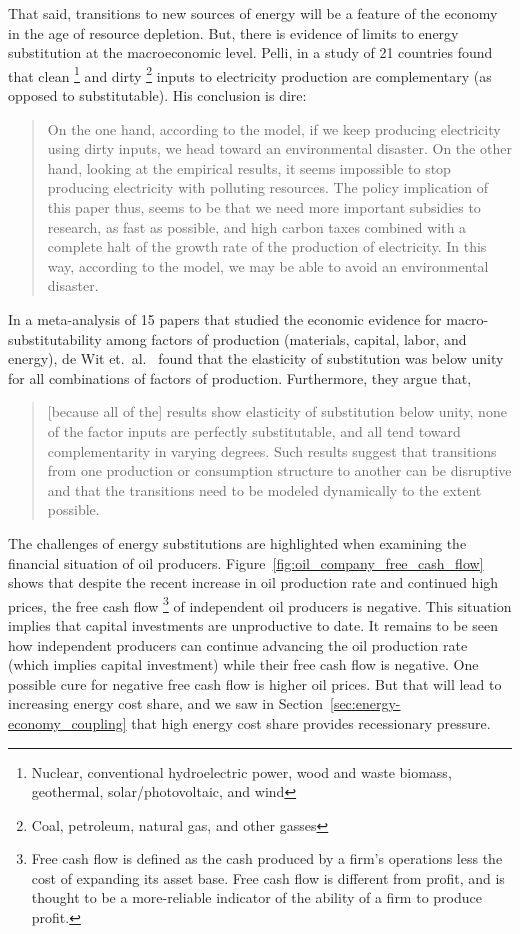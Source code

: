 That said, transitions to new sources of energy will be a feature 
of the economy in the age of resource depletion.
But, there is evidence of limits to energy substitution 
at the macroeconomic level.
Pelli, in a study of 21 countries 
found that clean%
	\footnote{
	Nuclear, 
	conventional hydroelectric power, wood and waste biomass, 
	geothermal, solar/photovoltaic, and wind
	}
and dirty%
	\footnote{
	Coal, 
	petroleum, natural gas, and other gasses
	}
inputs to electricity production
are complementary (as opposed to substitutable).\cite{Pelli:2012wv}
His conclusion is dire:
%
\begin{quote}
	On the one hand, according to the model, 
	if we keep producing electricity using dirty inputs, 
	we head toward an environmental disaster. 
	On the other hand, looking at the empirical results, 
	it seems impossible to stop producing electricity with polluting resources. 
	The policy implication of this paper thus, 
	seems to be that we need more important subsidies to research, 
	as fast as possible, 
	and high carbon taxes combined with a complete halt 
	of the growth rate of the production of electricity. 
	In this way, according to the model, 
	we may be able to avoid an environmental disaster.\cite[p.~25]{Pelli:2012wv}
\end{quote}

In a meta-analysis of 15 papers that studied 
the economic evidence for macro-substitutability
among factors of production (materials, capital, labor, and energy), 
de Wit et.\ al.~\cite{de-Wit:2013aa} found that the elasticity of substitution was 
below unity for all combinations of factors of production.
Furthermore, they argue that, 
%
\begin{quote}
	[because all of the] results show elasticity of substitution below unity, 
	none of the factor inputs are perfectly substitutable, and 
	all tend toward complementarity in varying degrees. 
	Such results suggest that transitions 
	from one production or consumption structure to another 
	can be disruptive and that the transitions 
	need to be modeled dynamically to the extent possible.\cite[p.~8]{de-Wit:2013aa}
\end{quote}

The challenges of energy substitutions are highlighted
when examining the financial situation of oil producers.
Figure~\ref{fig:oil_company_free_cash_flow} 
shows that despite the recent increase in oil production rate
and continued high prices, 
the free cash flow%
	\footnote{
	Free cash flow is defined as the cash produced by a firm's operations
	less the cost of expanding its asset base. 
	Free cash flow is different from profit,
	and is thought to be a more-reliable indicator of the ability of a firm
	to produce profit.
	}
of independent oil producers is negative.
This situation implies that capital investments are unproductive to date.
It remains to be seen how independent producers 
can continue advancing the oil production rate (which implies capital investment)
while their free cash flow is negative.
One possible cure for negative free cash flow is higher oil prices.
But that will lead to increasing energy cost share, 
and we saw in Section~\ref{sec:energy-economy_coupling}
that high energy cost share provides recessionary pressure.

